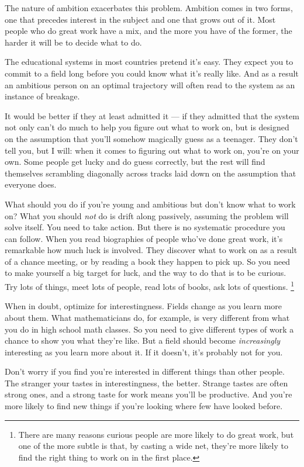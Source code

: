 \documentclass[12pt]{book}
\begin{document}
The nature of ambition exacerbates this problem. Ambition comes in two
forms, one that precedes interest in the subject and one that grows out
of it. Most people who do great work have a mix, and the more you have
of the former, the harder it will be to decide what to do.

The educational systems in most countries pretend it's easy. They expect
you to commit to a field long before you could know what it's really
like. And as a result an ambitious person on an optimal trajectory will
often read to the system as an instance of breakage.

It would be better if they at least admitted it --- if they admitted
that the system not only can't do much to help you figure out what to
work on, but is designed on the assumption that you'll somehow magically
guess as a teenager. They don't tell you, but I will: when it comes to
figuring out what to work on, you're on your own. Some people get lucky
and do guess correctly, but the rest will find themselves scrambling
diagonally across tracks laid down on the assumption that everyone does.

What should you do if you're young and ambitious but don't know what to
work on? What you should \emph{not} do is drift along passively,
assuming the problem will solve itself. You need to take action. But
there is no systematic procedure you can follow. When you read
biographies of people who've done great work, it's remarkable how much
luck is involved. They discover what to work on as a result of a chance
meeting, or by reading a book they happen to pick up. So you need to
make yourself a big target for luck, and the way to do that is to be
curious. Try lots of things, meet lots of people, read lots of books,
ask lots of questions. \footnote{There are many reasons curious people are more likely to do
great work, but one of the more subtle is that, by casting a wide net,
they're more likely to find the right thing to work on in the first
place.}

When in doubt, optimize for interestingness. Fields change as you learn
more about them. What mathematicians do, for example, is very different
from what you do in high school math classes. So you need to give
different types of work a chance to show you what they're like. But a
field should become \emph{increasingly} interesting as you learn more
about it. If it doesn't, it's probably not for you.

Don't worry if you find you're interested in different things than other
people. The stranger your tastes in interestingness, the better. Strange
tastes are often strong ones, and a strong taste for work means you'll
be productive. And you're more likely to find new things if you're
looking where few have looked before.
\end{document}
